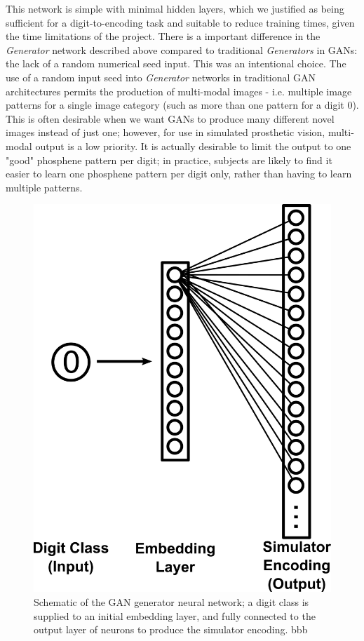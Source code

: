 \documentclass[a4paper,11pt,openany]{book}
\begin{document}
This network is simple with minimal hidden layers, which we justified as being sufficient for a digit-to-encoding task and suitable to reduce training times, given the time limitations of the project.
There is a important difference in the \emph{Generator} network described above compared to traditional \emph{Generators} in GANs: the lack of a random numerical seed input.
This was an intentional choice.
The use of a random input seed into \emph{Generator} networks in traditional GAN architectures permits the production of multi-modal images - i.e. multiple image patterns for a single image category (such as more than one pattern for a digit 0).
This is often desirable when we want GANs to produce many different novel images instead of just one; however, for use in simulated prosthetic vision, multi-modal output is a low priority.
It is actually desirable to limit the output to one "good" phosphene pattern per digit; in practice, subjects are likely to find it easier to learn one phosphene pattern per digit only, rather than having to learn multiple patterns.

\begin{figure}[htbp]
\centering
\includegraphics[height=0.5\textheight]{./images/generator.png}
\caption[Schematic of the GAN Generator neural network]{\label{fig:org89a253e}
Schematic of the GAN generator neural network; a digit class is supplied to an initial embedding layer, and fully connected to the output layer of neurons to produce the simulator encoding. bbb}
\end{figure}
\end{document}

